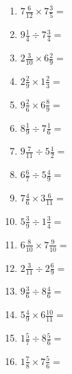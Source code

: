 \documentclass[12pt]{article}
\begin{document}
\begin{enumerate}
\item \large $ 7 \frac{6}{12} \times 7 \frac{3}{5} = $ \vspace{1.6cm}
\item \large $ 9 \frac{1}{4} \div 7 \frac{3}{4} = $ \vspace{1.6cm}
\item \large $ 2 \frac{3}{10} \times 6 \frac{2}{9} = $ \vspace{1.6cm}
\item \large $ 2 \frac{2}{9} \times 1 \frac{2}{3} = $ \vspace{1.6cm}
\item \large $ 9 \frac{2}{6} \times 6 \frac{8}{9} = $ \vspace{1.6cm}
\item \large $ 8 \frac{1}{9} \div 7 \frac{1}{6} = $ \vspace{1.6cm}
\newpage
\item \large $ 9 \frac{7}{11} \div 5 \frac{1}{2} = $ \vspace{1.6cm}
\item \large $ 6 \frac{6}{7} \div 5 \frac{4}{9} = $ \vspace{1.6cm}
\item \large $ 7 \frac{4}{6} \times 3 \frac{6}{11} = $ \vspace{1.6cm}
\item \large $ 5 \frac{3}{9} \div 1 \frac{3}{4} = $ \vspace{1.6cm}
\item \large $ 6 \frac{8}{10} \times 7 \frac{9}{10} = $ \vspace{1.6cm}
\item \large $ 2 \frac{3}{11} \div 2 \frac{6}{9} = $ \vspace{1.6cm}
\item \large $ 9 \frac{3}{6} \div 8 \frac{4}{6} = $ \vspace{1.6cm}
\item \large $ 5 \frac{4}{9} \times 6 \frac{10}{11} = $ \vspace{1.6cm}
\item \large $ 1 \frac{5}{7} \div 8 \frac{5}{6} = $ \vspace{1.6cm}
\item \large $ 1 \frac{7}{8} \times 7 \frac{5}{6} = $ \vspace{1.6cm}
\end{enumerate}
\newpage
\end{document}
